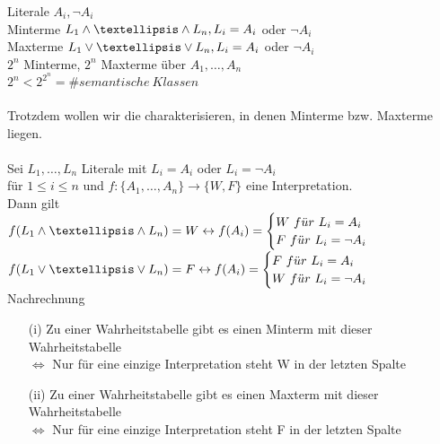 

\noindent
Literale $A_i, \neg A_i$\\
Minterme $L_1 \AND … \AND L_n, L_i = A_i$ oder $\neg A_i$\\
Maxterme $L_1 \OR … \OR L_n, L_i = A_i$ oder $ \neg A_i$\\

\noindent
$2^n$ Minterme, $2^n$ Maxterme über $A_1, …, A_n$\\
$2^n < 2^{2^n} = \# semantische\ Klassen$\\
\noindent\\
Trotzdem wollen wir die  charakterisieren, in denen Minterme bzw. Maxterme liegen.\\

\\
Sei $L_1, …, L_n$ Literale mit $L_i = A_i$ oder $L_i = \neg A_i$\\
für $1 \leq i \leq n$ und $f: \{A_1, …, A_n\} \rightarrow \{W, F\}$ eine Interpretation.\\
Dann gilt\\
$f(L_1 \AND … \AND L_n) = W \leftrightarrow f(A_i) = \begin{cases} W\ f\ddot{u}r\ L_i = A_i \\ F\ f\ddot{u}r\ L_i = \neg A_i \end{cases}$\\
$f(L_1 \OR … \OR L_n) = F \leftrightarrow f(A_i) = \begin{cases} F\ f\ddot{u}r\ L_i = A_i \\ W\ f\ddot{u}r\ L_i = \neg A_i \end{cases}$\\

\beweis{} Nachrechnung

\begin{enumerate}
\item[(i)] Zu einer Wahrheitstabelle gibt es einen Minterm mit dieser Wahrheitstabelle \\
$\Leftrightarrow$ Nur für eine einzige Interpretation steht W in der letzten Spalte 

\item[(ii)] Zu einer Wahrheitstabelle gibt es einen Maxterm mit dieser Wahrheitstabelle \\
$\Leftrightarrow$ Nur für eine einzige Interpretation steht F in der letzten Spalte
\end{enumerate}

